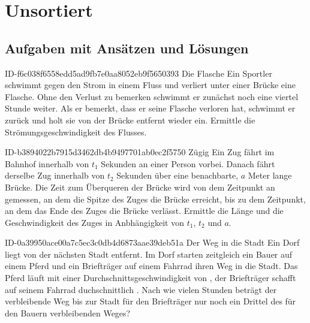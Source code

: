 \setcounter{chapter}{-1}
\chapter{Unsortiert}

\section{Aufgaben mit Ansätzen und Lösungen}

\begin{exercise}
      {ID-f6c038f6558edd5ad9fb7e0aa8052eb9f5650393}
      {Die Flasche}
  \ifproblem\problem
    Ein Sportler schwimmt gegen den Strom in einem Fluss und verliert unter
    einer Brücke eine Flasche. Ohne den Verlust zu bemerken schwimmt er
    zunächst noch eine viertel Stunde weiter. Als er bemerkt, dass er seine
    Flasche verloren hat, schwimmt er zurück und holt sie  von der
    Brücke entfernt wieder ein. Ermittle die Strömungsgeschwindigkeit des
    Flusses.
  \fi
\end{exercise}

\begin{exercise}
      {ID-b3894022b7915d3462db4b9497701ab0ec2f5750}
      {Zügig}
  \ifproblem\problem
    Ein Zug fährt im Bahnhof innerhalb von $t_{1}$ Sekunden an einer Person vorbei.
    Danach fährt derselbe Zug innerhalb von $t_{2}$ Sekunden über eine benachbarte,
    $a$ Meter lange Brücke. Die Zeit zum Überqueren der Brücke wird von dem Zeitpunkt
    an gemessen, an dem die Spitze des Zuges die Brücke erreicht, bis zu dem
    Zeitpunkt, an dem das Ende des Zuges die Brücke verlässt.
    Ermittle die Länge und die Geschwindigkeit des Zuges in Anbhängigkeit von $t_{1}$,
    $t_{2}$ und $a$.
  \fi
\end{exercise}

\begin{exercise}
      {ID-0a39950ace00a7c5ec3c0db4d6873aae39deb51a}
      {Der Weg in die Stadt}
  \ifproblem\problem
    Ein Dorf liegt  von der nächsten Stadt entfernt. Im Dorf starten zeitgleich
    ein Bauer auf einem Pferd und ein Briefträger auf einem Fahrrad ihren Weg in die Stadt.
    Das Pferd läuft mit einer Durchschnittsgeschwindigkeit von , der Briefträger
    schafft auf seinem Fahrrad duchschnittlich . Nach wie vielen Stunden beträgt
    der verbleibende Weg bis zur Stadt für den Briefträger nur noch ein Drittel des für
    den Bauern verbleibenden Weges?
  \fi
\end{exercise}

